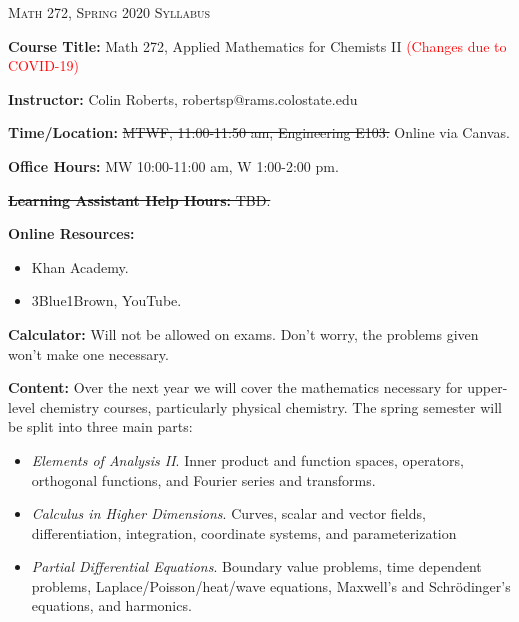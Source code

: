 \documentclass[12pt]{amsbook}
\begin{document}

\SetWatermarkText{
\begin{minipage}[c][8cm]{8cm}
\begin{center}
 
\end{center}
\end{minipage}
}



\begin{center}
   \textsc{\large Math 272, Spring 2020 Syllabus}
\end{center}
\vspace{.5cm}

\textbf{Course Title:} Math 272, Applied Mathematics for Chemists II \textcolor{red}{(Changes due to COVID-19)}

\textbf{Instructor:} Colin Roberts, robertsp@rams.colostate.edu

\textbf{Time/Location:} \sout{MTWF, 11:00-11:50 am, Engineering E103.} Online via Canvas.

\textbf{Office Hours:} MW 10:00-11:00 am, W 1:00-2:00 pm.

\sout{\textbf{Learning Assistant Help Hours:} TBD.}

\textbf{Online Resources:} \begin{itemize}
    \item Khan Academy.
    \item 3Blue1Brown, YouTube.
\end{itemize}

\textbf{Calculator:} Will not be allowed on exams.  Don't worry, the problems given won't make one necessary.

\textbf{Content:} Over the next year we will cover the mathematics necessary for upper-level chemistry courses, particularly physical chemistry. The spring semester will be split into three main parts:
\begin{itemize}
    \item \emph{Elements of Analysis II}. Inner product and function spaces, operators, orthogonal functions, and Fourier series and transforms.
    \item \emph{Calculus in Higher Dimensions}. Curves, scalar and vector fields, differentiation, integration, coordinate systems, and parameterization
    \item \emph{Partial Differential Equations}. Boundary value problems, time dependent problems, Laplace/Poisson/heat/wave equations, Maxwell's and Schr\"odinger's equations, and harmonics.
\end{itemize}
\end{document}
